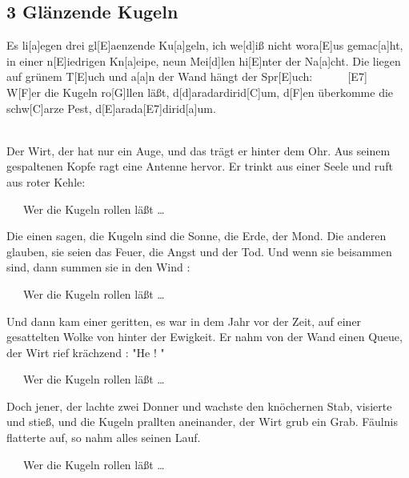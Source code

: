 \documentclass[10pt,a5paper,twoside, cleardoubleplain]{scrbook}
\begin{document}
  	
  	  
\newpage  

\subsection{3 Glänzende Kugeln}
\begin{guitar}
Es li[a]egen drei gl[E]aenzende Ku[a]geln, ich we[d]iß nicht wora[E]us gemac[a]ht,
in einer n[E]iedrigen Kn[a]eipe, neun Mei[d]len hi[E]nter der Na[a]cht.
Die liegen auf grünem T[E]uch und a[a]n der Wand hängt der Spr[E]uch:   ~~~~~  [E7]
\\

  W[F]er die Kugeln ro[G]llen läßt, d[d]aradardirid[C]um,
  d[F]en überkomme die schw[C]arze Pest, d[E]arada[E7]dirid[a]um.

\\
Der Wirt, der hat nur ein Auge, und das trägt er hinter dem Ohr.
Aus seinem gespaltenen Kopfe ragt eine Antenne hervor.
Er trinkt aus einer Seele und ruft aus roter Kehle:

~~~Wer die Kugeln rollen läßt \ldots

Die einen sagen, die Kugeln sind die Sonne, die Erde, der Mond.
Die anderen glauben, sie seien das Feuer, die Angst und der Tod. 
Und wenn sie beisammen sind, dann summen sie in den Wind :

~~~Wer die Kugeln rollen läßt \ldots

Und dann kam einer geritten, es war in dem Jahr vor der Zeit,
auf einer gesattelten Wolke von hinter der Ewigkeit.
Er nahm von der Wand einen Queue, der Wirt rief krächzend : "He ! "

~~~Wer die Kugeln rollen läßt \ldots

Doch jener, der lachte zwei Donner und wachste den knöchernen Stab, 
visierte und stieß, und die Kugeln prallten aneinander, der Wirt grub ein Grab. 
Fäulnis flatterte auf, so nahm alles seinen Lauf.

~~~Wer die Kugeln rollen läßt \ldots
\end{guitar}
  	  

\newpage  

  	
\end{document}
